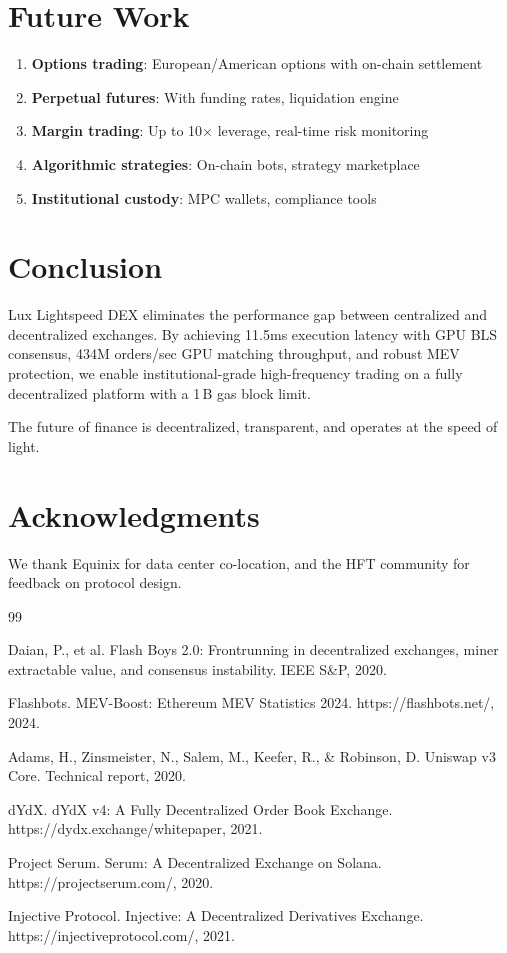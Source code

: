 \documentclass[11pt,letterpaper]{article}
\begin{document}
\section{Future Work}

\begin{enumerate}
    \item \textbf{Options trading}: European/American options with on-chain settlement
    \item \textbf{Perpetual futures}: With funding rates, liquidation engine
    \item \textbf{Margin trading}: Up to 10× leverage, real-time risk monitoring
    \item \textbf{Algorithmic strategies}: On-chain bots, strategy marketplace
    \item \textbf{Institutional custody}: MPC wallets, compliance tools
\end{enumerate}

\section{Conclusion}

Lux Lightspeed DEX eliminates the performance gap between centralized and decentralized exchanges. By achieving 11.5ms execution latency with GPU BLS consensus, 434M orders/sec GPU matching throughput, and robust MEV protection, we enable institutional-grade high-frequency trading on a fully decentralized platform with a 1\,B gas block limit.

The future of finance is decentralized, transparent, and operates at the speed of light.

\section*{Acknowledgments}

We thank Equinix for data center co-location, and the HFT community for feedback on protocol design.

\begin{thebibliography}{99}

Daian, P., et al. Flash Boys 2.0: Frontrunning in decentralized exchanges, miner extractable value, and consensus instability. IEEE S\&P, 2020.

Flashbots. MEV-Boost: Ethereum MEV Statistics 2024. https://flashbots.net/, 2024.

Adams, H., Zinsmeister, N., Salem, M., Keefer, R., \& Robinson, D. Uniswap v3 Core. Technical report, 2020.

dYdX. dYdX v4: A Fully Decentralized Order Book Exchange. https://dydx.exchange/whitepaper, 2021.

Project Serum. Serum: A Decentralized Exchange on Solana. https://projectserum.com/, 2020.

Injective Protocol. Injective: A Decentralized Derivatives Exchange. https://injectiveprotocol.com/, 2021.

\end{thebibliography}
\end{document}

